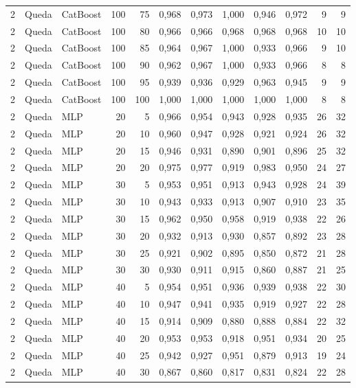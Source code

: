 \begin{longtable}{@{}rllrrrrrrrrr@{}}
2 & Queda & CatBoost & 100 & 75 & 0,968 & 0,973 & 1,000 & 0,946 & 0,972 & 9 & 9 \\
2 & Queda & CatBoost & 100 & 80 & 0,966 & 0,966 & 0,968 & 0,968 & 0,968 & 10 & 10 \\
2 & Queda & CatBoost & 100 & 85 & 0,964 & 0,967 & 1,000 & 0,933 & 0,966 & 9 & 10 \\
2 & Queda & CatBoost & 100 & 90 & 0,962 & 0,967 & 1,000 & 0,933 & 0,966 & 8 & 8 \\
2 & Queda & CatBoost & 100 & 95 & 0,939 & 0,936 & 0,929 & 0,963 & 0,945 & 9 & 9 \\
2 & Queda & CatBoost & 100 & 100 & 1,000 & 1,000 & 1,000 & 1,000 & 1,000 & 8 & 8 \\
2 & Queda & MLP & 20 & 5 & 0,966 & 0,954 & 0,943 & 0,928 & 0,935 & 26 & 32 \\
2 & Queda & MLP & 20 & 10 & 0,960 & 0,947 & 0,928 & 0,921 & 0,924 & 26 & 32 \\
2 & Queda & MLP & 20 & 15 & 0,946 & 0,931 & 0,890 & 0,901 & 0,896 & 25 & 32 \\
2 & Queda & MLP & 20 & 20 & 0,975 & 0,977 & 0,919 & 0,983 & 0,950 & 24 & 27 \\
2 & Queda & MLP & 30 & 5 & 0,953 & 0,951 & 0,913 & 0,943 & 0,928 & 24 & 39 \\
2 & Queda & MLP & 30 & 10 & 0,943 & 0,933 & 0,913 & 0,907 & 0,910 & 23 & 35 \\
2 & Queda & MLP & 30 & 15 & 0,962 & 0,950 & 0,958 & 0,919 & 0,938 & 22 & 26 \\
2 & Queda & MLP & 30 & 20 & 0,932 & 0,913 & 0,930 & 0,857 & 0,892 & 23 & 28 \\
2 & Queda & MLP & 30 & 25 & 0,921 & 0,902 & 0,895 & 0,850 & 0,872 & 21 & 28 \\
2 & Queda & MLP & 30 & 30 & 0,930 & 0,911 & 0,915 & 0,860 & 0,887 & 21 & 25 \\
2 & Queda & MLP & 40 & 5 & 0,954 & 0,951 & 0,936 & 0,939 & 0,938 & 22 & 30 \\
2 & Queda & MLP & 40 & 10 & 0,947 & 0,941 & 0,935 & 0,919 & 0,927 & 22 & 28 \\
2 & Queda & MLP & 40 & 15 & 0,914 & 0,909 & 0,880 & 0,888 & 0,884 & 22 & 32 \\
2 & Queda & MLP & 40 & 20 & 0,953 & 0,953 & 0,918 & 0,951 & 0,934 & 20 & 25 \\
2 & Queda & MLP & 40 & 25 & 0,942 & 0,927 & 0,951 & 0,879 & 0,913 & 19 & 24 \\
2 & Queda & MLP & 40 & 30 & 0,867 & 0,860 & 0,817 & 0,831 & 0,824 & 22 & 28 \\

\end{longtable}
